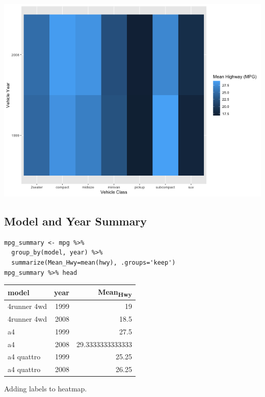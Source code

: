 \documentclass[11pt]{article}
\begin{document}
\begin{org}
\begin{center}
\includegraphics[width=.9\linewidth]{./resources/mpg_heatmap1.png}
\end{center}
\end{org}

\subsection{Model and Year Summary}
\label{sec:org839ef2f}

\begin{verbatim}
mpg_summary <- mpg %>%
  group_by(model, year) %>%
  summarize(Mean_Hwy=mean(hwy), .groups='keep')
mpg_summary %>% head
\end{verbatim}

\begin{org}
\begin{center}
\begin{tabular}{lrr}
model & year & Mean\textsubscript{Hwy}\\
\hline
4runner 4wd & 1999 & 19\\
4runner 4wd & 2008 & 18.5\\
a4 & 1999 & 27.5\\
a4 & 2008 & 29.3333333333333\\
a4 quattro & 1999 & 25.25\\
a4 quattro & 2008 & 26.25\\
\end{tabular}
\end{center}
\end{org}

Adding labels to heatmap.
\end{document}
